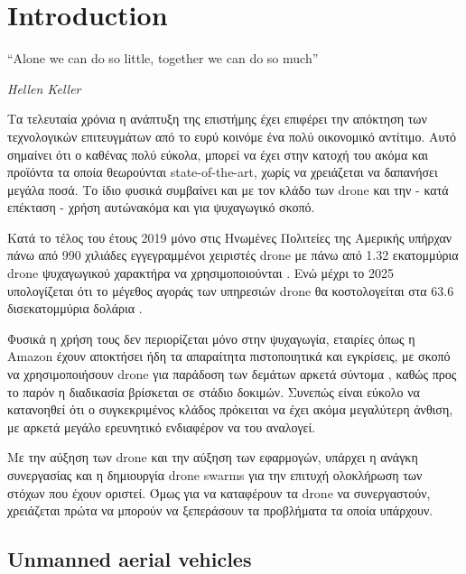 \chapter{Introduction} %
\label{chap:Chapter1}  %
\epigraph{``Alone we can do so little, together we can do so much” }{\textit{Hellen Keller}}


Τα τελευταία χρόνια η ανάπτυξη της επιστήμης έχει επιφέρει την απόκτηση των 
τεχνολογικών επιτευγμάτων από το ευρύ κοινό\udot με ένα πολύ οικονομικό αντίτιμο. Αυτό σημαίνει
ότι ο καθένας πολύ εύκολα, μπορεί να έχει στην κατοχή του ακόμα και προϊόντα τα οποία θεωρούνται 
state-of-the-art, χωρίς να χρειάζεται να δαπανήσει μεγάλα ποσά. 
Το ίδιο φυσικά συμβαίνει και με τον κλάδο των drone και την - κατά επέκταση - χρήση αυτών\udot ακόμα και 
για ψυχαγωγικό σκοπό.  

Κατά το τέλος του έτους 2019 μόνο στις Ηνωμένες Πολιτείες της Αμερικής υπήρχαν πάνω από 
990 χιλιάδες εγγεγραμμένοι χειριστές drone με πάνω από 1.32 εκατομμύρια drone ψυχαγωγικού 
χαρακτήρα να χρησιμοποιούνται \cite{2019-drone-statistic}. Ενώ μέχρι το 2025 υπολογίζεται 
ότι το μέγεθος αγοράς των υπηρεσιών drone θα κοστολογείται στα 63.6 δισεκατομμύρια δολάρια \cite{expected-drone-market}.

Φυσικά η χρήση τους δεν περιορίζεται μόνο στην ψυχαγωγία, εταιρίες όπως η Amazon έχουν 
αποκτήσει ήδη τα απαραίτητα πιστοποιητικά και εγκρίσεις, με σκοπό να 
χρησιμοποιήσουν drone για παράδοση των δεμάτων αρκετά σύντομα \cite{amazon-drones}, καθώς προς το παρόν
η διαδικασία βρίσκεται σε στάδιο δοκιμών. 
Συνεπώς είναι εύκολο να κατανοηθεί ότι ο συγκεκριμένος κλάδος πρόκειται να έχει ακόμα μεγαλύτερη 
άνθιση, με αρκετά μεγάλο ερευνητικό ενδιαφέρον να του αναλογεί.   

Με την αύξηση των drone και την αύξηση των εφαρμογών, υπάρχει η ανάγκη συνε\-ργασίας και η δημιουργία drone swarms 
για την επιτυχή ολοκλήρωση των στόχων που έχουν οριστεί. Όμως για να καταφέρουν τα drone
να συνεργαστούν, χρειάζεται πρώτα να μπορούν να ξεπεράσουν τα προβλήματα τα οποία υπάρχουν.

\newpage

\section{Unmanned aerial vehicles} \label{sec:Chapter1-1} 


